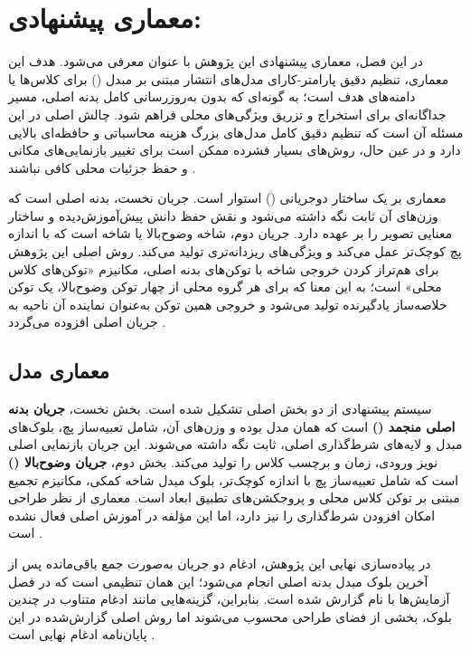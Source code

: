 \chapter{معماری پیشنهادی: }
\label{ch:proposed_method}

در این فصل، معماری پیشنهادی این پژوهش با عنوان  معرفی می‌شود. هدف این معماری، تنظیم دقیق پارامتر-کارای مدل‌های انتشار مبتنی بر مبدل () برای کلاس‌ها یا دامنه‌های هدف است؛ به گونه‌ای که بدون به‌روزرسانی کامل بدنه اصلی، مسیر جداگانه‌ای برای استخراج و تزریق ویژگی‌های محلی فراهم شود. چالش اصلی در این مسئله آن است که تنظیم دقیق کامل مدل‌های بزرگ هزینه محاسباتی و حافظه‌ای بالایی دارد و در عین حال، روش‌های بسیار فشرده ممکن است برای تغییر بازنمایی‌های مکانی و حفظ جزئیات محلی کافی نباشند \cite{2212.09748,8409325}.

معماری  بر یک ساختار دوجریانی () استوار است. جریان نخست، بدنه اصلی  است که وزن‌های آن ثابت نگه داشته می‌شود و نقش حفظ دانش پیش‌آموزش‌دیده و ساختار معنایی تصویر را بر عهده دارد. جریان دوم، شاخه وضوح‌بالا یا شاخه  است که با اندازه پچ کوچک‌تر عمل می‌کند و ویژگی‌های ریزدانه‌تری تولید می‌کند. روش اصلی این پژوهش برای هم‌تراز کردن خروجی شاخه  با توکن‌های بدنه اصلی، مکانیزم «توکن‌های کلاس محلی» است؛ به این معنا که برای هر گروه محلی از چهار توکن وضوح‌بالا، یک توکن خلاصه‌ساز یادگیرنده تولید می‌شود و خروجی همین توکن به‌عنوان نماینده آن ناحیه به جریان اصلی افزوده می‌گردد \cite{2212.09748,chen2021crossvit,Dosovitskiy2020}.

\section{معماری مدل}
سیستم پیشنهادی از دو بخش اصلی تشکیل شده است. بخش نخست، \textbf{جریان بدنه اصلی منجمد ()} است که همان مدل  بوده و وزن‌های آن، شامل تعبیه‌ساز پچ، بلوک‌های مبدل و لایه‌های شرط‌گذاری اصلی، ثابت نگه داشته می‌شوند. این جریان بازنمایی اصلی نویز ورودی، زمان و برچسب کلاس را تولید می‌کند. بخش دوم، \textbf{جریان وضوح‌بالا ()} است که شامل تعبیه‌ساز پچ با اندازه کوچک‌تر، بلوک مبدل شاخه کمکی، مکانیزم تجمیع مبتنی بر توکن کلاس محلی و پروجکشن‌های تطبیق ابعاد است. معماری از نظر طراحی امکان افزودن شرط‌گذاری  را نیز دارد، اما این مؤلفه در آموزش اصلی  فعال نشده است \cite{2212.09748,Dosovitskiy2020,perez2018film}.

در پیاده‌سازی نهایی این پژوهش، ادغام دو جریان به‌صورت جمع باقی‌مانده پس از آخرین بلوک مبدل بدنه اصلی انجام می‌شود؛ این همان تنظیمی است که در فصل آزمایش‌ها با نام  گزارش شده است. بنابراین، گزینه‌هایی مانند ادغام متناوب در چندین بلوک، بخشی از فضای طراحی محسوب می‌شوند اما روش اصلی گزارش‌شده در این پایان‌نامه ادغام نهایی است \cite{Vaswani2017,2212.09748}.

